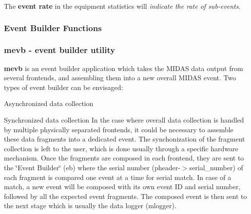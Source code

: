 \begin{DoxyItemize}
\item The {\bfseries  event rate } in the equipment statistics will {\itshape  indicate the rate of sub-\/events\/}.
\end{DoxyItemize}

\par
 

\par
 \label{index_end}
\hypertarget{index_end}{}
 \subsubsection{Event Builder Functions}\label{FE_Event_Builder}
\par
 

\par
 \label{FE_Event_Builder_idx_mevb-utility}
\hypertarget{FE_Event_Builder_idx_mevb-utility}{}
 \label{FE_Event_Builder_idx_event_builder_utility-see-mevb}
\hypertarget{FE_Event_Builder_idx_event_builder_utility-see-mevb}{}




 \hypertarget{FE_Event_Builder_FE_mevb_utility}{}\subsubsection{mevb -\/ event builder utility}\label{FE_Event_Builder_FE_mevb_utility}
{\bfseries mevb} is an event builder application which takes the MIDAS data output from several frontends, and assembling them into a new overall MIDAS event. Two types of event builder can be envisaged:
\begin{DoxyItemize}
\item Asynchronized data collection
\begin{DoxyItemize}
\item Synchronized data collection In the case where overall data collection is handled by multiple physically separated frontends, it could be necessary to assemble these data fragments into a dedicated event. The synchonization of the fragment collection is left to the user, which is done usually through a specific hardware mechanism. Once the fragments are composed in each frontend, they are sent to the \char`\"{}Event Builder\char`\"{} (eb) where the serial number (pheader-\/$>$serial\_\-number) of each fragment is compared one event at a time for serial match. In case of a match, a new event will be composed with its own event ID and serial number, followed by all the expected event fragments. The composed event is then sent to the next stage which is usually the data logger (mlogger).
\end{DoxyItemize}
\end{DoxyItemize}

